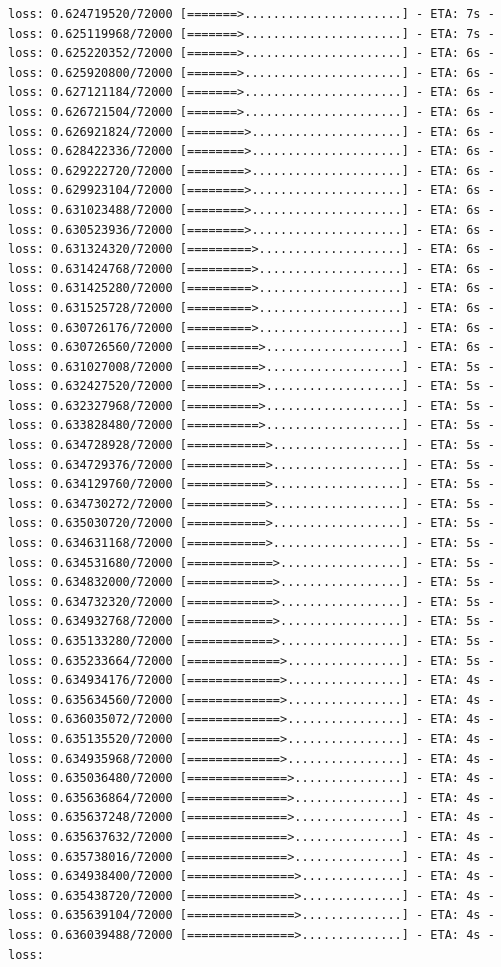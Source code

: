 \documentclass[12pt,fleqn]{article}\usepackage{../../common}
\begin{document}
\begin{verbatim}
loss: 0.624719520/72000 [=======>......................] - ETA: 7s - loss: 0.625119968/72000 [=======>......................] - ETA: 7s - loss: 0.625220352/72000 [=======>......................] - ETA: 6s - loss: 0.625920800/72000 [=======>......................] - ETA: 6s - loss: 0.627121184/72000 [=======>......................] - ETA: 6s - loss: 0.626721504/72000 [=======>......................] - ETA: 6s - loss: 0.626921824/72000 [========>.....................] - ETA: 6s - loss: 0.628422336/72000 [========>.....................] - ETA: 6s - loss: 0.629222720/72000 [========>.....................] - ETA: 6s - loss: 0.629923104/72000 [========>.....................] - ETA: 6s - loss: 0.631023488/72000 [========>.....................] - ETA: 6s - loss: 0.630523936/72000 [========>.....................] - ETA: 6s - loss: 0.631324320/72000 [=========>....................] - ETA: 6s - loss: 0.631424768/72000 [=========>....................] - ETA: 6s - loss: 0.631425280/72000 [=========>....................] - ETA: 6s - loss: 0.631525728/72000 [=========>....................] - ETA: 6s - loss: 0.630726176/72000 [=========>....................] - ETA: 6s - loss: 0.630726560/72000 [==========>...................] - ETA: 6s - loss: 0.631027008/72000 [==========>...................] - ETA: 5s - loss: 0.632427520/72000 [==========>...................] - ETA: 5s - loss: 0.632327968/72000 [==========>...................] - ETA: 5s - loss: 0.633828480/72000 [==========>...................] - ETA: 5s - loss: 0.634728928/72000 [===========>..................] - ETA: 5s - loss: 0.634729376/72000 [===========>..................] - ETA: 5s - loss: 0.634129760/72000 [===========>..................] - ETA: 5s - loss: 0.634730272/72000 [===========>..................] - ETA: 5s - loss: 0.635030720/72000 [===========>..................] - ETA: 5s - loss: 0.634631168/72000 [===========>..................] - ETA: 5s - loss: 0.634531680/72000 [============>.................] - ETA: 5s - loss: 0.634832000/72000 [============>.................] - ETA: 5s - loss: 0.634732320/72000 [============>.................] - ETA: 5s - loss: 0.634932768/72000 [============>.................] - ETA: 5s - loss: 0.635133280/72000 [============>.................] - ETA: 5s - loss: 0.635233664/72000 [=============>................] - ETA: 5s - loss: 0.634934176/72000 [=============>................] - ETA: 4s - loss: 0.635634560/72000 [=============>................] - ETA: 4s - loss: 0.636035072/72000 [=============>................] - ETA: 4s - loss: 0.635135520/72000 [=============>................] - ETA: 4s - loss: 0.634935968/72000 [=============>................] - ETA: 4s - loss: 0.635036480/72000 [==============>...............] - ETA: 4s - loss: 0.635636864/72000 [==============>...............] - ETA: 4s - loss: 0.635637248/72000 [==============>...............] - ETA: 4s - loss: 0.635637632/72000 [==============>...............] - ETA: 4s - loss: 0.635738016/72000 [==============>...............] - ETA: 4s - loss: 0.634938400/72000 [===============>..............] - ETA: 4s - loss: 0.635438720/72000 [===============>..............] - ETA: 4s - loss: 0.635639104/72000 [===============>..............] - ETA: 4s - loss: 0.636039488/72000 [===============>..............] - ETA: 4s - loss: 
\end{verbatim}
\end{document}
